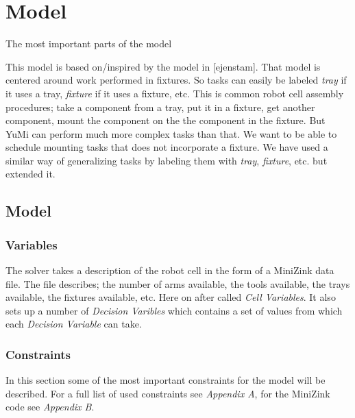 \chapter{Model}
The most important parts of the model

This model is based on/inspired by the model in [ejenstam]. That model is centered around work performed in fixtures. So tasks can easily be labeled \emph{tray} if it uses a tray, \emph{fixture} if it uses a fixture, etc. This is common robot cell assembly procedures; take a component from a tray, put it in a fixture, get another component, mount the component on the the component in the fixture. But YuMi can perform much more complex tasks than that. We want to be able to schedule mounting tasks that does not incorporate a fixture. We have used a similar way of generalizing tasks by labeling them with \emph{tray}, \emph{fixture}, etc. but extended it.
\section*{Model}
\subsection*{Variables}
The solver takes a description of the robot cell in the form of a MiniZink data file. The file describes; the number of arms available, the tools available, the trays available, the fixtures available, etc. Here on after called \emph{Cell Variables}. It also sets up a number of \emph{Decision Varibles} which contains a set of values from which each \emph{Decision Variable} can take.

\subsection{Constraints}
In this section some of the most important constraints for the model will be described. For a full list of used constraints see \emph{Appendix A}, for the MiniZink code see \emph{Appendix B}.